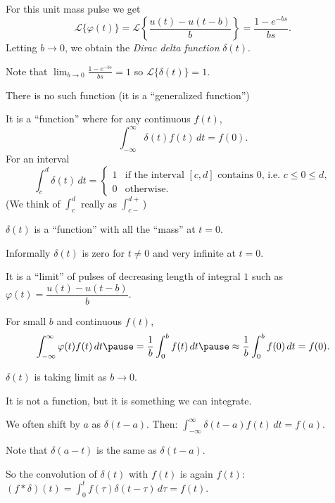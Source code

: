 \documentclass[10pt,aspectratio=169]{beamer}
\begin{document}
\begin{frame}
For this unit mass pulse we get
\[
{\mathcal{L}} \bigl\{ \varphi(t) \bigr\}
=
{\mathcal{L}} \left\{ \frac{u(t) - u(t-b)}{b}  \right\}
=
\frac{1 - e^{-bs}}{bs} .
\]
\pause
Letting $b \to 0$, we obtain the \emph{Dirac delta function}
$\delta(t)$.

\medskip
\pause

Note that
\quad
$\displaystyle
\lim_{b \to 0}
\frac{1-e^{-bs}}{bs} = 1$
\quad
so \quad ${\mathcal{L}} \bigl\{ \delta(t) \bigr\} = 1$.

\medskip
\pause

There is no such function (it is a ``generalized function'')

\medskip
\pause

It is a ``function'' where
for any continuous $f(t)$,
\[
\int_{-\infty}^\infty \delta(t) f(t) \,dt = f(0) .
\]
\pause
For an interval
\[
\int_c^d \delta(t) \,dt = 
\begin{cases}
1 & \text{if the interval $[c,d]$ contains 0, i.e.\ } c \leq 0 \leq d, \\
0 & \text{otherwise.}
\end{cases}
\]
(We think of $\int_c^d$ really as $\int_{c-}^{d+}$)

\end{frame}

\begin{frame}

$\delta(t)$ is a ``function'' with all the ``mass'' at $t=0$.

\medskip
\pause

Informally $\delta(t)$ is zero for $t \neq 0$ and very infinite at $t=0$.

\medskip
\pause

It is a ``limit'' of pulses of decreasing length
of integral $1$ such as
\quad
$\varphi(t) = \dfrac{u(t) - u(t-b)}{b}$.

\medskip
\pause

For small $b$ and continuous $f(t)$,
\[
\int_{-\infty}^\infty \varphi(t) f(t) \,dt
\pause
=
\frac{1}{b} \int_{0}^b f(t) \,dt
\pause
\approx
\frac{1}{b} \int_{0}^b f(0) \,dt = f(0) .
\]

\pause
$\delta(t)$ is taking limit as $b \to 0$.

\medskip
\pause

It is not a function, but it is something we can integrate.

\medskip
\pause

We often shift by $a$ as $\delta(t-a)$.  Then:
\qquad
$\displaystyle
\int_{-\infty}^\infty \delta(t-a) f(t) \,dt = f(a) .
$

\medskip
\pause

Note that $\delta(a-t)$ is the same as $\delta(t-a)$.

So the convolution of $\delta(t)$ with $f(t)$ is again $f(t)$:
\qquad
$\displaystyle
(f * \delta) (t) = 
\int_{0}^t f(\tau) \delta(t-\tau) \,d\tau
= f(t) .
$
\end{frame}
\end{document}
